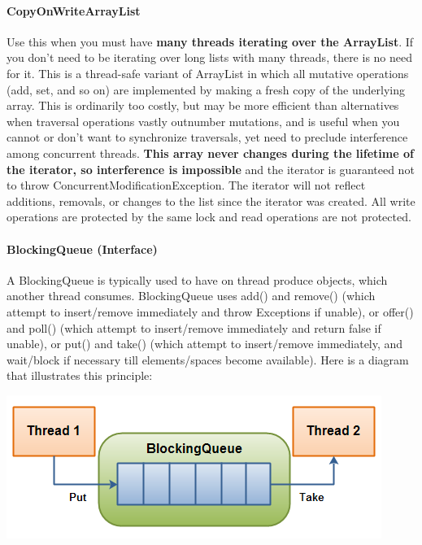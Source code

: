 \documentclass{article}
\begin{document}
\paragraph{CopyOnWriteArrayList} Use this when you must have \textbf{many threads iterating over the ArrayList}. If you don't need to be iterating over long lists with many threads, there is no need for it. This is a thread-safe variant of ArrayList in which all mutative operations (add, set, and so on) are implemented by making a fresh copy of the underlying array. This is ordinarily too costly, but may be more efficient than alternatives when traversal operations vastly outnumber mutations, and is useful when you cannot or don't want to synchronize traversals, yet need to preclude interference among concurrent threads. \textbf{This array never changes during the lifetime of the iterator, so interference is impossible} and the iterator is guaranteed not to throw ConcurrentModificationException. The iterator will not reflect additions, removals, or changes to the list since the iterator was created. All write operations are protected by the same lock and read operations are not protected.

\paragraph{BlockingQueue (Interface)} A BlockingQueue is typically used to have on thread produce objects, which another thread consumes. BlockingQueue uses add() and remove() (which attempt to insert/remove immediately and throw Exceptions if unable), or offer() and poll() (which attempt to insert/remove immediately and return false if unable), or put() and take() (which attempt to insert/remove immediately, and wait/block if necessary till elements/spaces become available). Here is a diagram that illustrates this principle:

\begin{center}
\includegraphics[scale=0.5]{blocking-queue.png}
\end{center}
\end{document}
